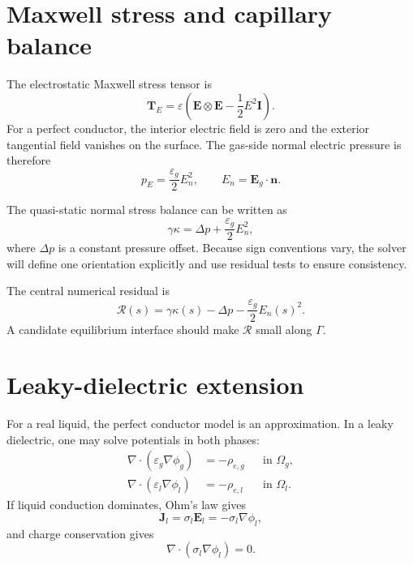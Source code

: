 \documentclass[11pt]{article}
\newcommand{\eps}{\varepsilon}
\newcommand{\vE}{\mathbf{E}}
\newcommand{\vJ}{\mathbf{J}}
\newcommand{\vn}{\mathbf{n}}
\newcommand{\vT}{\mathbf{T}}
\newcommand{\grad}{\nabla}
\newcommand{\divg}{\nabla\!\cdot}
\begin{document}
\section{Maxwell stress and capillary balance}

The electrostatic Maxwell stress tensor is
\begin{equation}
    \vT_E=\eps\left(\vE\otimes\vE-\frac12E^2\mathbf{I}\right).
\end{equation}
For a perfect conductor, the interior electric field is zero and the exterior tangential field vanishes on the surface. The gas-side normal electric pressure is therefore
\begin{equation}
    p_E = \frac{\eps_g}{2}E_n^2,
    \qquad
    E_n = \vE_g\cdot\vn.
\end{equation}

The quasi-static normal stress balance can be written as
\begin{equation}
    \gamma\kappa = \Delta p + \frac{\eps_g}{2}E_n^2,
    \label{eq:ylm_balance}
\end{equation}
where \(\Delta p\) is a constant pressure offset. Because sign conventions vary, the solver will define one orientation explicitly and use residual tests to ensure consistency.

The central numerical residual is
\begin{equation}
    \mathcal{R}(s)
    =
    \gamma\kappa(s)-\Delta p-\frac{\eps_g}{2}E_n(s)^2.
    \label{eq:residual}
\end{equation}
A candidate equilibrium interface should make \(\mathcal{R}\) small along \(\Gamma\).

\section{Leaky-dielectric extension}

For a real liquid, the perfect conductor model is an approximation. In a leaky dielectric, one may solve potentials in both phases:
\begin{align}
    \divg(\eps_g\grad\phi_g)&=-\rho_{e,g} &&\text{in }\Omega_g,\\
    \divg(\eps_l\grad\phi_l)&=-\rho_{e,l} &&\text{in }\Omega_l.
\end{align}
If liquid conduction dominates, Ohm's law gives
\begin{equation}
    \vJ_l=\sigma_l\vE_l=-\sigma_l\grad\phi_l,
\end{equation}
and charge conservation gives
\begin{equation}
    \divg(\sigma_l\grad\phi_l)=0.
\end{equation}
\end{document}
